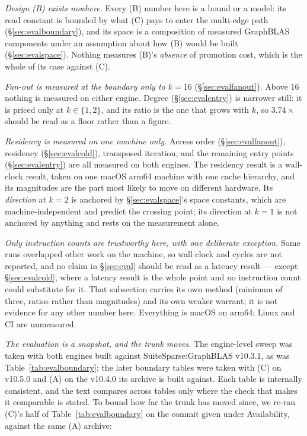 \documentclass[11pt,a4paper]{article}
\theoremstyle{plain}
\theoremstyle{definition}
\theoremstyle{remark}
\begin{document}
\emph{Design (B) exists nowhere.} Every (B) number here is a bound or a model:
its read constant is bounded by what (C) pays to enter the multi-edge path
(\S\ref{sec:evalboundary}), and its space is a composition of measured
GraphBLAS components under an assumption about how (B) would be built
(\S\ref{sec:evalspace}). Nothing measures (B)'s \emph{absence} of promotion
cost, which is the whole of its case against (C).

\emph{Fan-out is measured at the boundary only to $k = 16$}
(\S\ref{sec:evalfanout}). Above $16$ nothing is measured on either engine.
Degree (\S\ref{sec:evalentry}) is narrower still: it is priced only at
$k \in \{1, 2\}$, and its ratio is the one that grows with $k$, so $3.74\times$
should be read as a floor rather than a figure.

\emph{Residency is measured on one machine only.} Access order
(\S\ref{sec:evalfanout}), residency (\S\ref{sec:evalcold}), transposed
iteration, and the remaining entry points (\S\ref{sec:evalentry}) are all
measured on both engines. The residency result is a wall-clock result, taken
on one macOS arm64 machine with one cache hierarchy, and its magnitudes are the
part most likely to move on different hardware. Its \emph{direction} at $k=2$ is
anchored by \S\ref{sec:evalspace}'s space constants, which are machine-independent
and predict the crossing point; its direction at $k=1$ is not anchored by
anything and rests on the measurement alone.

\emph{Only instruction counts are trustworthy here, with one deliberate
exception.} Some runs overlapped other work on the machine, so wall clock and
cycles are not reported, and no claim in \S\ref{sec:eval} should be read as a
latency result --- except \S\ref{sec:evalcold}, where a latency result is the
whole point and no instruction count could substitute for it. That subsection
carries its own method (minimum of three, ratios rather than magnitudes) and its
own weaker warrant; it is not evidence for any other number here. Everything is
macOS on arm64; Linux and CI are unmeasured.

\emph{The evaluation is a snapshot, and the trunk moves.} The engine-level
sweep was taken with both engines built against SuiteSparse:GraphBLAS v10.3.1,
as was Table~\ref{tab:evalboundary}; the later boundary tables were taken with
(C) on v10.5.0 and (A) on the v10.4.0 its archive is built against. Each table
is internally consistent, and the text compares across tables only where the
check that makes it comparable is stated. To bound how far the trunk has moved
since, we re-ran (C)'s half of Table~\ref{tab:evalboundary} on the commit given
under Availability, against the same (A) archive:
\end{document}
